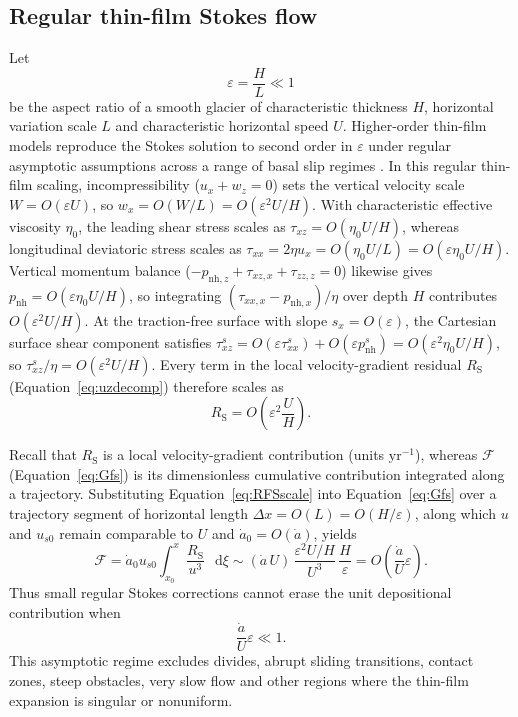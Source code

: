 \documentclass[review]{igs}
\begin{document}
\subsection{Regular thin-film Stokes flow}

Let
\begin{equation}
\varepsilon=\frac{H}{L}\ll1
\label{eq:aspectratio}
\end{equation}
be the aspect ratio of a smooth glacier of characteristic thickness \(H\), horizontal variation scale \(L\) and characteristic horizontal speed \(U\). Higher-order thin-film models reproduce the Stokes solution to second order in \(\varepsilon\) under regular asymptotic assumptions across a range of basal slip regimes \citep{Blatter1995,SchoofHindmarsh2010}. In this regular thin-film scaling, incompressibility (\(u_x+w_z=0\)) sets the vertical velocity scale \(W=O(\varepsilon U)\), so \(w_x=O(W/L)=O(\varepsilon^2 U/H)\). With characteristic effective viscosity \(\eta_0\), the leading shear stress scales as \(\tau_{xz}=O(\eta_0 U/H)\), whereas longitudinal deviatoric stress scales as \(\tau_{xx}=2\eta u_x=O(\eta_0 U/L)=O(\varepsilon\eta_0 U/H)\). Vertical momentum balance (\(-p_{\mathrm{nh},z}+\tau_{xz,x}+\tau_{zz,z}=0\)) likewise gives \(p_{\mathrm{nh}}=O(\varepsilon\eta_0 U/H)\), so integrating \((\tau_{xx,x}-p_{\mathrm{nh},x})/\eta\) over depth \(H\) contributes \(O(\varepsilon^2 U/H)\). At the traction-free surface with slope \(s_x=O(\varepsilon)\), the Cartesian surface shear component satisfies \(\tau_{xz}^{s}=O(\varepsilon\tau_{xx}^{s})+O(\varepsilon p_{\mathrm{nh}}^{s})=O(\varepsilon^2\eta_0 U/H)\), so \(\tau_{xz}^{s}/\eta=O(\varepsilon^2 U/H)\). Every term in the local velocity-gradient residual \(R_{\mathrm{S}}\) (Equation~\ref{eq:uzdecomp}) therefore scales as
\begin{equation}
R_{\mathrm{S}}=O\!\left(\varepsilon^2\frac{U}{H}\right).
\label{eq:RFSscale}
\end{equation}

Recall that \(R_{\mathrm{S}}\) is a local velocity-gradient contribution (units \(\mathrm{yr^{-1}}\)), whereas \(\mathcal{F}\) (Equation~\ref{eq:Gfs}) is its dimensionless cumulative contribution integrated along a trajectory. Substituting Equation~\ref{eq:RFSscale} into Equation~\ref{eq:Gfs} over a trajectory segment of horizontal length \(\Delta x=O(L)=O(H/\varepsilon)\), along which \(u\) and \(u_{s0}\) remain comparable to \(U\) and \(\dot a_0=O(\dot a)\), yields
\begin{equation}
\mathcal{F}
=\dot a_0u_{s0}\int_{x_0}^{x}\frac{R_{\mathrm{S}}}{u^3}\,\mathop{}\!\mathrm{d}\xi
\sim (\dot a\,U)\,\frac{\varepsilon^2 U/H}{U^3}\,\frac{H}{\varepsilon}
=O\!\left(\frac{\dot a}{U}\varepsilon\right).
\label{eq:GFSscale}
\end{equation}
Thus small regular Stokes corrections cannot erase the unit depositional contribution when
\begin{equation}
\frac{\dot a}{U}\varepsilon\ll1.
\label{eq:thinorder}
\end{equation}
This asymptotic regime excludes divides, abrupt sliding transitions, contact zones, steep obstacles, very slow flow and other regions where the thin-film expansion is singular or nonuniform.
\end{document}
